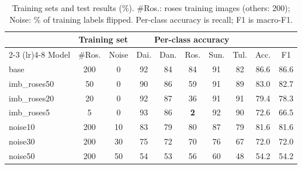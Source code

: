 \begin{table}[t]
\centering\footnotesize
\setlength{\tabcolsep}{1.7pt}
\begin{tabular}{lccccccccc}
\toprule
& \multicolumn{2}{c}{Training set} & \multicolumn{5}{c}{Per-class accuracy} & & \\
\cmidrule(lr){2-3} \cmidrule(lr){4-8}
Model & \#Ros. & Noise & Dai. & Dan. & Ros. & Sun. & Tul. & Acc. & F1 \\
\midrule
base & 200 & 0 & 92 & 84 & 84 & 91 & 82 & 86.6 & 86.6 \\
\midrule
imb\_roses50 & 50 & 0 & 90 & 86 & 59 & 91 & 89 & 83.0 & 82.7 \\
imb\_roses20 & 20 & 0 & 92 & 87 & 36 & 91 & 91 & 79.4 & 78.3 \\
imb\_roses5 & 5 & 0 & 93 & 86 & \textbf{2} & 92 & 90 & 72.6 & 66.5 \\
\midrule
noise10 & 200 & 10 & 83 & 79 & 80 & 87 & 79 & 81.6 & 81.6 \\
noise30 & 200 & 30 & 75 & 72 & 70 & 76 & 67 & 72.0 & 72.0 \\
noise50 & 200 & 50 & 54 & 53 & 56 & 60 & 48 & 54.2 & 54.2 \\
\bottomrule
\end{tabular}
\caption{Training sets and test results (\%). \#Ros.: roses training images (others: 200); Noise: \% of training labels flipped. Per-class accuracy is recall; F1 is macro-F1.}
\label{tab:results}
\end{table}
